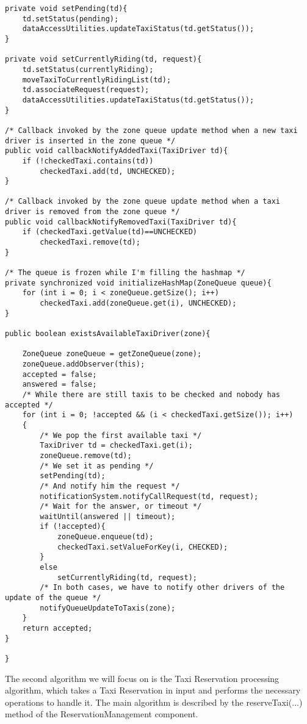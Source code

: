 \begin{lstlisting}
private void setPending(td){
	td.setStatus(pending);
	dataAccessUtilities.updateTaxiStatus(td.getStatus());
}

private void setCurrentlyRiding(td, request){
	td.setStatus(currentlyRiding);
	moveTaxiToCurrentlyRidingList(td);
	td.associateRequest(request);
	dataAccessUtilities.updateTaxiStatus(td.getStatus());
}

/* Callback invoked by the zone queue update method when a new taxi
driver is inserted in the zone queue */
public void callbackNotifyAddedTaxi(TaxiDriver td){
	if (!checkedTaxi.contains(td))
		checkedTaxi.add(td, UNCHECKED);
}

/* Callback invoked by the zone queue update method when a taxi
driver is removed from the zone queue */
public void callbackNotifyRemovedTaxi(TaxiDriver td){
	if (checkedTaxi.getValue(td)==UNCHECKED)
		checkedTaxi.remove(td);
}

/* The queue is frozen while I'm filling the hashmap */
private synchronized void initializeHashMap(ZoneQueue queue){
	for (int i = 0; i < zoneQueue.getSize(); i++)
		checkedTaxi.add(zoneQueue.get(i), UNCHECKED);		
}

public boolean existsAvailableTaxiDriver(zone){
	
	ZoneQueue zoneQueue = getZoneQueue(zone);
	zoneQueue.addObserver(this);
	accepted = false;
	answered = false;
	/* While there are still taxis to be checked and nobody has accepted */
	for (int i = 0; !accepted && (i < checkedTaxi.getSize()); i++)	
	{
		/* We pop the first available taxi */
		TaxiDriver td = checkedTaxi.get(i);
		zoneQueue.remove(td);
		/* We set it as pending */
		setPending(td);
		/* And notify him the request */
		notificationSystem.notifyCallRequest(td, request);
		/* Wait for the answer, or timeout */
		waitUntil(answered || timeout);
		if (!accepted){
			zoneQueue.enqueue(td);
			checkedTaxi.setValueForKey(i, CHECKED);
		}
		else
			setCurrentlyRiding(td, request);
		/* In both cases, we have to notify other drivers of the update of the queue */
		notifyQueueUpdateToTaxis(zone);
	}
	return accepted;
}

}	
\end{lstlisting}

The second algorithm we will focus on is the Taxi Reservation processing algorithm, which takes a Taxi Reservation in input and performs the necessary operations to handle it. The main algorithm is described by the reserveTaxi(...) method of the ReservationManagement component.

